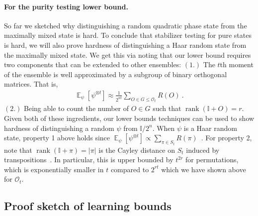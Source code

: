 \documentclass[11pt]{article}
\newcommand{\E}{\mathop{\mathbb{E}}}
\newcommand{\id}{\ensuremath{\mathbb{I}}}
\newcommand{\Oc}{\mathcal{O}}
\DeclareMathOperator{\rank}{rank}
\begin{document}
\paragraph{For the purity testing lower bound.} So far we sketched why distinguishing a random quadratic phase state from the maximally mixed state is hard. To conclude that stabilizer testing for pure states is hard, we will also prove hardness of distinguishing a Haar random state from the maximally mixed state. We get this via noting that our lower bound requires two components that can be extended to other ensembles:
$(1.)$ The $t$th moment of the ensemble is well approximated by a subgroup of binary orthogonal matrices. That is,
    \begin{align}
        \E_\psi[\psi^{\otimes t}] \approx \frac{1}{2^{nt}}\sum_{O \in G \leq \Oc_t} R(O)\ .
    \end{align}
   $(2.)$ Being able to count the number of $O\in G$ such that $\rank(\id+O) = r$.  Given both of these ingredients, our lower bounds techniques can be used to show hardness of distinguishing a random $\psi$ from $\id/2^n$. When $\psi$ is a Haar random state, property 1 above holds since $\E_\psi[\psi^{\otimes t}] \propto \sum_{\pi \in S_t}R(\pi)$~\cite{harrow2013church}. For property 2, note that $\rank(\id+\pi) = \vert \pi \vert$ is the Cayley distance on $S_t$ induced by transpositions~\cite{harrow2023approximate}. In particular, this is upper bounded by $t^{2r}$ for permutations, which is exponentially smaller in $t$ compared to $2^{rt}$ which we have shown above for $\Oc_t$. 

\subsection{Proof sketch of learning bounds}
\end{document}
